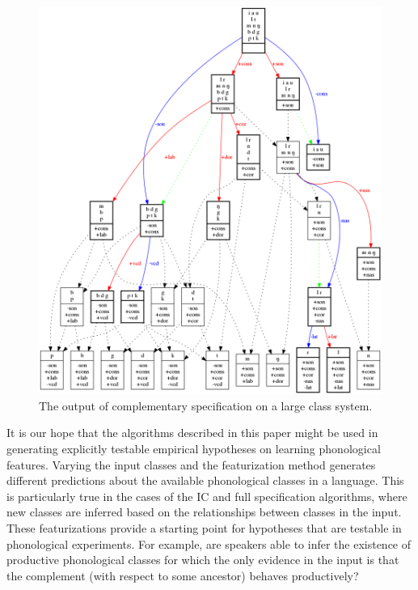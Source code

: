 \documentclass[12pt, oneside]{article}   	%
\begin{document}
\begin{figure}[htb!]
  \centering
  \includegraphics[width=\textwidth]{biggun.png}
  \caption{The output of complementary specification on a large class system. }
  \label{fig:big_alphabet}
\end{figure}

It is our hope that the algorithms described in this paper might be used in generating explicitly testable empirical hypotheses on learning phonological features. Varying the input classes and the featurization method generates different predictions about the available phonological classes in a language. This is particularly true in the cases of the IC and full specification algorithms, where new classes are inferred based on the relationships between classes in the input. These featurizations provide a starting point for hypotheses that are testable in phonological experiments. For example, are speakers able to infer the existence of productive phonological classes for which the only evidence in the input is that the complement (with respect to some ancestor) behaves productively? 
\end{document}
